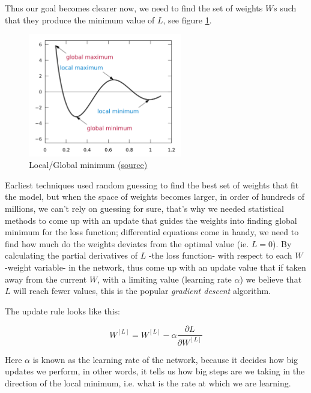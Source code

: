 Thus our goal becomes clearer now, we need to find the set of weights $Ws$ such that they produce the minimum value of $L$, see figure \ref{fig:global_minima}.

\begin{figure}[h]
\centering
\includegraphics[width=0.6\textwidth]{images/global_minima.png}
\caption{Local/Global minimum \href{https://en.wikipedia.org/wiki/Maxima_and_minima}{(\underline{source})}}
\label{fig:global_minima}
\end{figure}

Earliest techniques used random guessing to find the best set of weights that fit the model, but when the space of weights becomes larger, in order of hundreds of millions, we can't rely on guessing for sure, that's why we needed statistical methods to come up with an update that guides the weights into finding global minimum for the loss function; differential equations come in handy, we need to find how much do the weights deviates from the optimal value (ie. $L=0$). By calculating the partial derivatives of $L$ -the loss function- with respect to each $W$ -weight variable- in the network, thus come up with an update value that if taken away from the current $W$, with a limiting value (learning rate $\alpha$) we believe that $L$ will reach fewer values, this is the popular \textit{gradient descent} algorithm.

The update rule looks like this:

\begin{equation} \label{eq:backward_prop_1}
    W^{[L]} = W^{[L]} - \alpha \frac{\partial L}{\partial W^{[L]}}
\end{equation}

Here $\alpha$ is known as the learning rate of the network, because it decides how big updates we perform, in other words, it tells us how big steps are we taking in the direction of the local minimum, i.e. what is the rate at which we are learning.

